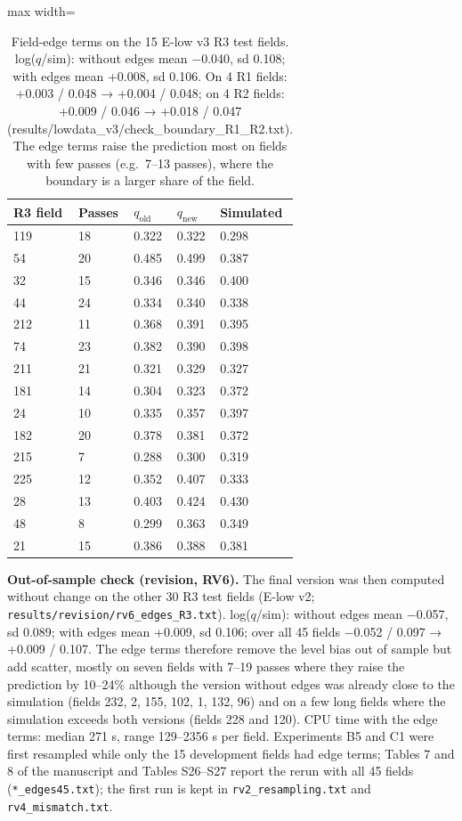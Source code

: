 \documentclass[preprint,12pt,authoryear]{elsarticle}
\begin{document}
\begin{table}[!htbp]
\centering
\footnotesize
\renewcommand{\thetable}{S5b}\caption{Field-edge terms on the 15 E-low v3 R3 test fields. log(\(q\)/sim): without edges mean −0.040, sd 0.108; with edges mean +0.008, sd 0.106. On 4 R1 fields: +0.003 / 0.048 → +0.004 / 0.048; on 4 R2 fields: +0.009 / 0.046 → +0.018 / 0.047 (results/lowdata\_v3/check\_boundary\_R1\_R2.txt). The edge terms raise the prediction most on fields with few passes (e.g.~7--13 passes), where the boundary is a larger share of the field.}
\begin{adjustbox}{max width=\textwidth}
\begin{tabular}{@{}lllll@{}}
\toprule
\textbf{R3 field} & \textbf{Passes} & \textbf{\(q_\mathrm{old}\)} & \textbf{\(q_\mathrm{new}\)} & \textbf{Simulated} \\
\midrule
119 & 18 & 0.322 & 0.322 & 0.298 \\
54 & 20 & 0.485 & 0.499 & 0.387 \\
32 & 15 & 0.346 & 0.346 & 0.400 \\
44 & 24 & 0.334 & 0.340 & 0.338 \\
212 & 11 & 0.368 & 0.391 & 0.395 \\
74 & 23 & 0.382 & 0.390 & 0.398 \\
211 & 21 & 0.321 & 0.329 & 0.327 \\
181 & 14 & 0.304 & 0.323 & 0.372 \\
24 & 10 & 0.335 & 0.357 & 0.397 \\
182 & 20 & 0.378 & 0.381 & 0.372 \\
215 & 7 & 0.288 & 0.300 & 0.319 \\
225 & 12 & 0.352 & 0.407 & 0.333 \\
28 & 13 & 0.403 & 0.424 & 0.430 \\
48 & 8 & 0.299 & 0.363 & 0.349 \\
21 & 15 & 0.386 & 0.388 & 0.381 \\
\bottomrule
\end{tabular}
\end{adjustbox}
\end{table}

\textbf{Out-of-sample check (revision, RV6).} The final version was then computed without change on the other 30 R3 test fields (E-low v2; \texttt{results/revision/rv6\_edges\_R3.txt}). log(\(q\)/sim): without edges mean −0.057, sd 0.089; with edges mean +0.009, sd 0.106; over all 45 fields −0.052 / 0.097 → +0.009 / 0.107. The edge terms therefore remove the level bias out of sample but add scatter, mostly on seven fields with 7--19 passes where they raise the prediction by 10--24\% although the version without edges was already close to the simulation (fields 232, 2, 155, 102, 1, 132, 96) and on a few long fields where the simulation exceeds both versions (fields 228 and 120). CPU time with the edge terms: median 271 s, range 129--2356 s per field. Experiments B5 and C1 were first resampled while only the 15 development fields had edge terms; Tables 7 and 8 of the manuscript and Tables S26--S27 report the rerun with all 45 fields (\texttt{*\_edges45.txt}); the first run is kept in \texttt{rv2\_resampling.txt} and \texttt{rv4\_mismatch.txt}.
\end{document}
